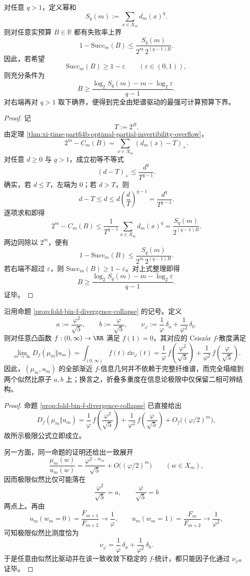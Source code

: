 \begin{theorem}[幂和诱导的非渐近失败率指数界与可计算预算下界]\label{thm:xi-time-part64b-power-sum-failure-bound-budget-lower}
对任意 \(q>1\)，定义幂和
\[
S_q(m):=\sum_{x\in X_m}d_m(x)^q.
\]
则对任意实预算 \(B\in\mathbb R\) 都有失败率上界
\[
1-\mathrm{Succ}_m(B)
\le
\frac{S_q(m)}{2^m\,2^{(q-1)B}}.
\]
因此，若希望
\[
\mathrm{Succ}_m(B)\ge 1-\varepsilon
\qquad (\varepsilon\in(0,1)),
\]
则充分条件为
\[
B\ge
\frac{\log_2 S_q(m)-m-\log_2\varepsilon}{q-1}.
\]
对右端再对 \(q>1\) 取下确界，便得到完全由矩谱驱动的最强可计算预算下界。
\end{theorem}
\begin{proof}
记
\[
T:=2^B.
\]
由定理 \ref{thm:xi-time-part64b-optimal-partial-invertibility-overflow}，
\[
2^m-C_m(B)=\sum_{x\in X_m}(d_m(x)-T)_+.
\]
对任意 \(d\ge 0\) 与 \(q>1\)，成立初等不等式
\[
(d-T)_+\le \frac{d^q}{T^{q-1}}.
\]
确实，若 \(d\le T\)，左端为 \(0\)；若 \(d>T\)，则
\[
d-T\le d\le d\left(\frac{d}{T}\right)^{q-1}=\frac{d^q}{T^{q-1}}.
\]
逐项求和即得
\[
2^m-C_m(B)
\le
\frac{1}{T^{q-1}}\sum_{x\in X_m}d_m(x)^q
=
\frac{S_q(m)}{2^{(q-1)B}}.
\]
两边同除以 \(2^m\)，便有
\[
1-\mathrm{Succ}_m(B)\le \frac{S_q(m)}{2^m\,2^{(q-1)B}}.
\]
若右端不超过 \(\varepsilon\)，则 \(\mathrm{Succ}_m(B)\ge 1-\varepsilon\)。对上式整理即得
\[
B\ge
\frac{\log_2 S_q(m)-m-\log_2\varepsilon}{q-1}.
\]
证毕。
\end{proof}

\begin{theorem}[折叠信息几何的二点塌缩原理]\label{thm:xi-time-part64b-fold-information-geometry-two-point-collapse}
沿用命题 \ref{prop:fold-bin-f-divergence-collapse} 的记号。定义
\[
a:=\frac{\varphi^2}{\sqrt5},
\qquad
b:=\frac{\varphi}{\sqrt5},
\qquad
\nu_\varphi:=\frac1\varphi\,\delta_a+\frac1{\varphi^2}\,\delta_b.
\]
则对任意凸函数 \(f:(0,\infty)\to\RR\) 满足 \(f(1)=0\)，其对应的 Csisz\'ar \(f\)-散度满足
\[
\boxed{\;
\lim_{m\to\infty}D_f(\mu_m\Vert u_m)
=
\int_{(0,\infty)}f(t)\,\dd\nu_\varphi(t)
=
\frac1\varphi\,f\!\left(\frac{\varphi^2}{\sqrt5}\right)
+\frac1{\varphi^2}\,f\!\left(\frac{\varphi}{\sqrt5}\right).\;}
\]
因此，\((\mu_m,u_m)\) 的全部渐近 \(f\)-信息几何并不依赖于完整纤维谱，而完全塌缩到两个似然比原子 \(a,b\) 上；换言之，折叠多重度在信息论极限中仅保留二相可辨结构。
\end{theorem}
\begin{proof}
命题 \ref{prop:fold-bin-f-divergence-collapse} 已直接给出
\[
D_f(\mu_m\Vert u_m)
=
\frac1\varphi\,f\!\left(\frac{\varphi^2}{\sqrt5}\right)
+\frac1{\varphi^2}\,f\!\left(\frac{\varphi}{\sqrt5}\right)
+O_f\bigl((\varphi/2)^m\bigr),
\]
故所示极限公式立即成立。

另一方面，同一命题的证明还给出一致展开
\[
\frac{\mu_m(w)}{u_m(w)}
=
\frac{\varphi^{2-w_m}}{\sqrt5}+O\bigl((\varphi/2)^m\bigr)
\qquad (w\in X_m),
\]
因而极限似然比仅可能落在
\[
\frac{\varphi^2}{\sqrt5}=a,
\qquad
\frac{\varphi}{\sqrt5}=b
\]
两点上。再由
\[
u_m(w_m=0)=\frac{F_{m+1}}{F_{m+2}}\longrightarrow \frac1\varphi,
\qquad
u_m(w_m=1)=\frac{F_m}{F_{m+2}}\longrightarrow \frac1{\varphi^2},
\]
可知极限似然比测度恰为
\[
\nu_\varphi=\frac1\varphi\,\delta_a+\frac1{\varphi^2}\,\delta_b.
\]
于是任意由似然比驱动并在该一致收敛下稳定的 \(f\)-统计，都只能因子化通过 \(\nu_\varphi\)。证毕。
\end{proof}

